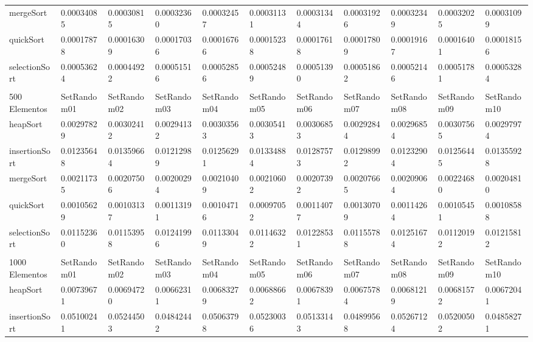 \documentclass[article,a4paper]{article}
\begin{document}
\begin{table}[h]
{\begin{tabular}{lllllllllll}
mergeSort       & 0.00034085  & 0.00030815  & 0.00032360  & 0.00032457  & 0.00031131  & 0.00031344  & 0.00031926  & 0.00032349  & 0.00032025  & 0.00031099  \\
quickSort       & 0.00017878  & 0.00016309  & 0.00017036  & 0.00016766  & 0.00015238  & 0.00017618  & 0.00017809  & 0.00019167  & 0.00016401  & 0.00018156  \\
selectionSort   & 0.00053624  & 0.00044922  & 0.00051516  & 0.00052856  & 0.00052489  & 0.00051390  & 0.00051862  & 0.00052146  & 0.00051781  & 0.00053284  \\
                &             &             &             &             &             &             &             &             &             &             \\
500 Elementos   & SetRandom01 & SetRandom02 & SetRandom03 & SetRandom04 & SetRandom05 & SetRandom06 & SetRandom07 & SetRandom08 & SetRandom09 & SetRandom10 \\
heapSort        & 0.00297829  & 0.00302412  & 0.00294132  & 0.00303563  & 0.00305413  & 0.00306853  & 0.00292844  & 0.00296854  & 0.00307565  & 0.00297974  \\
insertionSort   & 0.01235648  & 0.01359664  & 0.01212989  & 0.01256291  & 0.01334884  & 0.01287573  & 0.01298992  & 0.01232904  & 0.01256445  & 0.01355928  \\
mergeSort       & 0.00211735  & 0.00207506  & 0.00200294  & 0.00210409  & 0.00210602  & 0.00207392  & 0.00207665  & 0.00209064  & 0.00224680  & 0.00204810  \\
quickSort       & 0.00105629  & 0.00103137  & 0.00113191  & 0.00104716  & 0.00097052  & 0.00114077  & 0.00130709  & 0.00114264  & 0.00105451  & 0.00108588  \\
selectionSort   & 0.01152360  & 0.01153958  & 0.01241996  & 0.01133049  & 0.01146322  & 0.01228531  & 0.01155788  & 0.01251674  & 0.01120192  & 0.01215812  \\
                &             &             &             &             &             &             &             &             &             &             \\
1000 Elementos  & SetRandom01 & SetRandom02 & SetRandom03 & SetRandom04 & SetRandom05 & SetRandom06 & SetRandom07 & SetRandom08 & SetRandom09 & SetRandom10 \\
heapSort        & 0.00739671  & 0.00694720  & 0.00662311  & 0.00683279  & 0.00688662  & 0.00678391  & 0.00675784  & 0.00681219  & 0.00681572  & 0.00672041  \\
insertionSort   & 0.05100241  & 0.05244503  & 0.04842442  & 0.05063798  & 0.05230036  & 0.05133143  & 0.04899568  & 0.05267124  & 0.05200502  & 0.04858271  \\

\end{tabular}}
\end{table}
\end{document}
